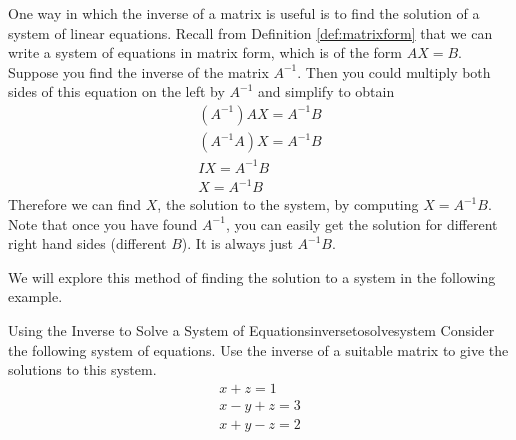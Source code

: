 One way in which the inverse of a matrix is useful is to find the solution of a system of linear equations.
Recall from Definition \ref{def:matrixform} that we can write a system of equations in matrix form, 
which is of the form $AX=B$. Suppose you find the
inverse of the matrix $A^{-1}$. Then you could multiply both sides of this
equation on the left by $A^{-1}$ and simplify to obtain
\begin{equation*}
\begin{array}{c}
\left( A^{-1} \right) AX =A^{-1}B \\
\left(A^{-1}A\right) X = A^{-1}B \\
IX = A^{-1}B \\
X = A^{-1}B
\end{array}
\end{equation*}
Therefore we can find $X$, the solution to the system, by computing $X=A^{-1}B$. 
Note that once you
have found $A^{-1}$, you can easily get the solution for different right
hand sides (different $B$). It is always just $A^{-1}B$. 
 
We will explore this method of finding the solution to a system in the following example. 

\begin{example}{Using the Inverse to Solve a System of Equations}{inversetosolvesystem}
 Consider the following system of
equations. Use the inverse of a suitable matrix to give the solutions to
this system.
\begin{equation*}
\begin{array}{c}
x+z=1 \\
x-y+z=3 \\
x+y-z=2
\end{array}
\end{equation*}
\end{example}

